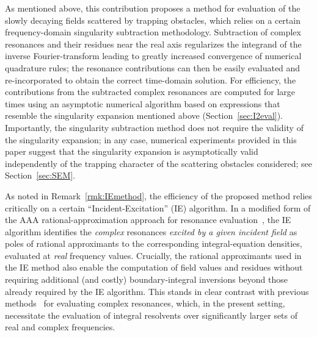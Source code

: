 \documentclass[11pt]{article}
\theoremstyle{plain}
\theoremstyle{remark}
\begin{document}
As mentioned above, this contribution proposes a method for evaluation
of the slowly decaying fields scattered by trapping obstacles, which
relies on a certain frequency-domain singularity subtraction
methodology. Subtraction of complex resonances and their residues near
the real axis regularizes the integrand of the inverse
Fourier-transform leading to greatly increased convergence of
numerical quadrature rules; the resonance contributions can then be
easily evaluated and re-incorporated to obtain the correct time-domain
solution. For efficiency, the contributions from the subtracted
complex resonances are computed for large times using an asymptotic
numerical algorithm based on expressions that resemble the singularity
expansion mentioned above (Section~\ref{sec:I2eval}). Importantly, the
singularity subtraction method does not require the validity of the
singularity expansion; in any case, numerical experiments provided in
this paper suggest that the singularity expansion is asymptotically
valid independently of the trapping character of the scattering
obstacles considered; see Section~\ref{sec:SEM}.

As noted in Remark~\ref{rmk:IEmethod}, the efficiency of the proposed
method relies critically on a certain ``Incident-Excitation'' (IE)
algorithm. In a modified form of the AAA rational-approximation
approach for resonance evaluation~\cite{bst}, the IE algorithm
identifies the {\em complex} resonances {\em excited by a given
  incident field} as poles of rational approximants to the
corresponding integral-equation densities, evaluated at {\em real}
frequency values. Crucially, the rational approximants used in the IE
method also enable the computation of field values and residues
without requiring additional (and costly) boundary-integral inversions
beyond those already required by the IE algorithm. This stands in
clear contrast with previous
methods~\cite{Beyn2012eigen,misawa2017boundary,asakura2009numerical,alves2024wave,el2020rational,guttel2017nonlinear,bst}
for evaluating complex resonances, which, in the present setting,
necessitate the evaluation of integral resolvents over significantly
larger sets of real and complex frequencies.
\end{document}
